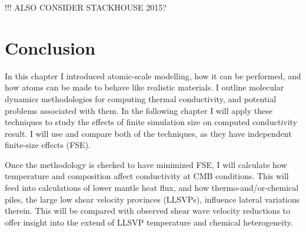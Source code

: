 !!! ALSO CONSIDER STACKHOUSE 2015?



\section{Conclusion}

In this chapter I introduced atomic-scale modelling, how it can be performed, and how atoms can be made to behave like realistic materials. I outline molecular dynamics methodologies for computing thermal conductivity, and potential problems associated with them. In the following chapter I will apply these techniques to study the effects of finite simulation size on computed \bdgs conductivity result. I will use and compare both of the techniques, as they have independent finite-size effects (FSE).

Once the methodology is checked to have minimized FSE, I will calculate how temperature and composition affect \bdgs conductivity at CMB conditions. This will feed into calculations of lower mantle heat flux, and how thermo-and/or-chemical piles, the large low shear velocity provinces (LLSVPs), influence lateral variations therein. This will be compared with observed shear wave velocity reductions to offer insight into the extend of LLSVP temperature and chemical heterogeneity.







